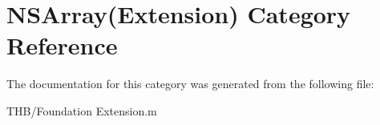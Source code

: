 \hypertarget{category_n_s_array_07_extension_08}{}\section{N\+S\+Array(Extension) Category Reference}
\label{category_n_s_array_07_extension_08}


The documentation for this category was generated from the following file\+:\begin{DoxyCompactItemize}
\item 
T\+H\+B/Foundation Extension.\+m\end{DoxyCompactItemize}
